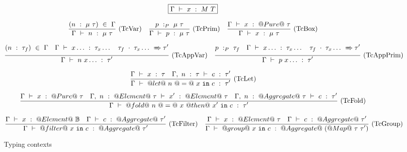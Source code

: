 \begin{figure*}

$$
\boxed{\Gamma ~\vdash~ x ~:~ M~T}
$$


$$
\frac {\displaystyle 
    (n~:~\mu~\tau)~\in~\Gamma
} {\displaystyle  
    \Gamma ~\vdash~ n ~:~ \mu~\tau
} \ 
\textrm{(TcVar)}
\quad
\frac {\displaystyle 
    p ~:_{P}~ \mu~\tau
} {\displaystyle 
    \Gamma ~\vdash~ p ~:~ \mu~\tau
} \ 
\textrm{(TcPrim)}
\quad
\frac {\displaystyle 
    \Gamma ~\vdash~ x ~:~ @Pure@~\tau
} {\displaystyle 
    \Gamma ~\vdash~ x ~:~ \mu~\tau
} \ 
\textrm{(TcBox)}
$$

$$
\frac {\displaystyle 
    (n~:~\tau_f)~\in~\Gamma
    \quad
    \Gamma ~\vdash~ x\ldots ~:~ \tau_x\ldots
    \quad
    \tau_f~\cdot~\tau_x\ldots ~\xRightarrow~ \tau'
} {\displaystyle 
    \Gamma ~\vdash~ n~x\ldots ~:~ \tau'
} \ 
\textrm{(TcAppVar)}
\quad
\frac {\displaystyle 
    p ~:_{P}~ \tau_f
    \quad
    \Gamma ~\vdash~ x\ldots ~:~ \tau_x\ldots
    \quad
    \tau_f~\cdot~\tau_x\ldots ~\xRightarrow~ \tau'
} {\displaystyle 
    \Gamma ~\vdash~ p~x\ldots ~:~ \tau'
} \ 
\textrm{(TcAppPrim)}
$$


$$
\frac {\displaystyle 
    \Gamma ~\vdash~ x ~:~ \tau
    \quad
    \Gamma,~n~:~\tau ~\vdash~ c ~:~ \tau'
} {\displaystyle 
    \Gamma ~\vdash~ @let@~n~@=@~x~\mathtt{in}~c ~:~ \tau'
} \ 
\textrm{(TcLet)}
$$

$$
\frac {\displaystyle 
    \Gamma ~\vdash~ x ~:~ @Pure@~\tau
    \quad
    \Gamma,~n~:~@Element@~\tau ~\vdash~ x' ~:~ @Element@~\tau
    \quad
    \Gamma,~n~:~@Aggregate@~\tau ~\vdash~ c ~:~ \tau'
} {\displaystyle 
    \Gamma ~\vdash~ @fold@~n~@=@~x~@then@~x'~\mathtt{in}~c ~:~ \tau'
} \ 
\textrm{(TcFold)}
$$

$$
\frac {\displaystyle 
    \Gamma ~\vdash~ x ~:~ @Element@~\mathbb{B}
    \quad
    \Gamma ~\vdash~ c ~:~ @Aggregate@~\tau'
} {\displaystyle 
    \Gamma ~\vdash~ @filter@~x~\mathtt{in}~c ~:~ @Aggregate@~\tau'
} \ 
\textrm{(TcFilter)}
\quad
\frac {\displaystyle 
    \Gamma ~\vdash~ x ~:~ @Element@~\tau
    \quad
    \Gamma ~\vdash~ c ~:~ @Aggregate@~\tau'
} {\displaystyle 
    \Gamma ~\vdash~ @group@~x~\mathtt{in}~c ~:~ @Aggregate@~(@Map@~\tau~\tau')
} \ 
\textrm{(TcGroup)}
$$



\caption{Typing contexts}
\label{fig:source:type:ctx}
\end{figure*}


